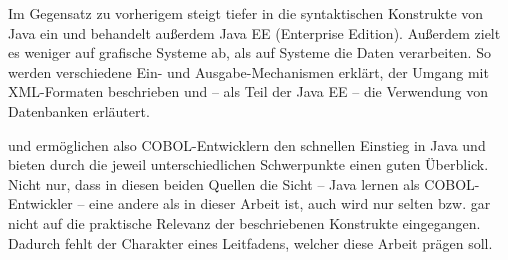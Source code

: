 Im Gegensatz zu vorherigem steigt  tiefer in die syntaktischen Konstrukte von Java ein und behandelt außerdem Java EE (Enterprise Edition). Außerdem zielt es weniger auf grafische Systeme ab, als auf Systeme die Daten verarbeiten. So werden verschiedene Ein- und Ausgabe-Mechanismen erklärt, der Umgang mit XML-Formaten beschrieben und -- als Teil der Java EE -- die Verwendung von Datenbanken erläutert.

 und  ermöglichen also COBOL-Entwicklern den schnellen Einstieg in Java und bieten durch die jeweil unterschiedlichen Schwerpunkte einen guten Überblick. Nicht nur, dass in diesen beiden Quellen die Sicht -- Java lernen als COBOL-Entwickler -- eine andere als in dieser Arbeit ist, auch wird nur selten bzw. gar nicht auf die praktische Relevanz der beschriebenen Konstrukte eingegangen. Dadurch fehlt der Charakter eines Leitfadens, welcher diese Arbeit prägen soll. 